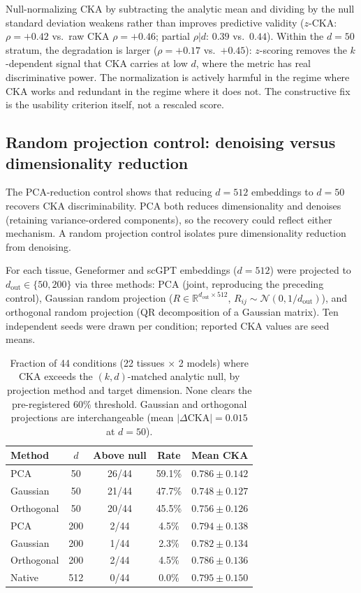 \documentclass[11pt]{article}
\newcommand{\R}{\mathbb{R}}
\begin{document}
Null-normalizing CKA by subtracting the analytic mean and dividing by
the null standard deviation weakens rather than improves predictive
validity ($z$-CKA: $\rho = +0.42$ vs.\ raw CKA $\rho = +0.46$;
partial $\rho|d$: $0.39$ vs.\ $0.44$). Within the $d = 50$ stratum,
the degradation is larger ($\rho = +0.17$ vs.\ $+0.45$): $z$-scoring
removes the $k$-dependent signal that CKA carries at low $d$, where the
metric has real discriminative power. The normalization is actively
harmful in the regime where CKA works and redundant in the regime where
it does not. The constructive fix is the usability criterion itself,
not a rescaled score.


\subsection{Random projection control: denoising versus dimensionality reduction}
\label{sec:randproj}

The PCA-reduction control shows that reducing $d = 512$ embeddings to
$d = 50$ recovers CKA discriminability. PCA both reduces dimensionality
and denoises (retaining variance-ordered components), so the recovery
could reflect either mechanism. A random projection control isolates
pure dimensionality reduction from denoising.

For each tissue, Geneformer and scGPT embeddings ($d = 512$) were
projected to $d_{\mathrm{out}} \in \{50, 200\}$ via three methods:
PCA (joint, reproducing the preceding control), Gaussian random
projection ($R \in \R^{d_{\mathrm{out}} \times 512}$,
$R_{ij} \sim \mathcal{N}(0, 1/d_{\mathrm{out}})$), and orthogonal
random projection (QR decomposition of a Gaussian matrix). Ten
independent seeds were drawn per condition; reported CKA values are
seed means.

\begin{table}[t]
\centering
\caption{Fraction of 44 conditions (22 tissues $\times$ 2 models) where
CKA exceeds the $(k, d)$-matched analytic null, by projection method and
target dimension. None clears the pre-registered 60\% threshold.
Gaussian and orthogonal projections are interchangeable (mean
$|\Delta\text{CKA}| = 0.015$ at $d = 50$).}
\label{tab:randproj}
\small
\begin{tabular}{@{}lcccc@{}}
\toprule
Method & $d$ & Above null & Rate & Mean CKA \\
\midrule
PCA              & 50  & 26/44 & 59.1\% & $0.786 \pm 0.142$ \\
Gaussian         & 50  & 21/44 & 47.7\% & $0.748 \pm 0.127$ \\
Orthogonal       & 50  & 20/44 & 45.5\% & $0.756 \pm 0.126$ \\
\midrule
PCA              & 200 &  2/44 &  4.5\% & $0.794 \pm 0.138$ \\
Gaussian         & 200 &  1/44 &  2.3\% & $0.782 \pm 0.134$ \\
Orthogonal       & 200 &  2/44 &  4.5\% & $0.786 \pm 0.136$ \\
\midrule
Native           & 512 &  0/44 &  0.0\% & $0.795 \pm 0.150$ \\
\bottomrule
\end{tabular}
\end{table}
\end{document}
